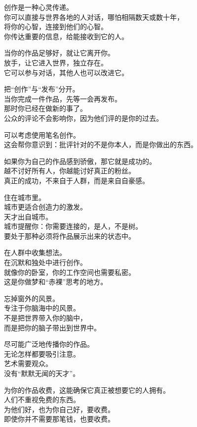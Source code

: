 \documentclass[
]{article}
\begin{document}
创作是一种心灵传递。\\
你可以直接与世界各地的人对话，哪怕相隔数天或数十年，\\
将你的心智，连接到他们的心智。\\
你传达重要的信息，给能接收到它的人。

当你的作品足够好，就让它离开你。\\
放手，让它进入世界，独立存在。\\
它可以参与对话，其他人也可以改进它。

把``创作''与``发布''分开。\\
当你完成一件作品，先等一会再发布。\\
那时你已经在做新的事了。\\
公众的评论不会影响你，因为他们评的是你的过去。

可以考虑使用笔名创作。\\
这会帮你意识到：批评针对的不是你本人，而是你做出的东西。

如果你为自己的作品感到骄傲，那它就是成功的。\\
越不讨好所有人，你越能讨好真正的粉丝。\\
真正的成功，不来自于人群，而是来自自豪感。

住在城市里。\\
城市更适合创造力的激发。\\
天才出自城市。\\
城市提醒你：你需要连接的，是人，不是树。\\
要处于那种必须将作品展示出来的状态中。

在人群中收集想法。\\
在沉默和独处中进行创作。\\
就像你的卧室，你的工作空间也需要私密。\\
这是你做梦和``赤裸''思考的地方。

忘掉窗外的风景。\\
专注于你脑海中的风景。\\
不是把世界带入你的脑中，\\
而是把你的脑子带出到世界中。

尽可能广泛地传播你的作品。\\
无论怎样都要吸引注意。\\
艺术需要观众。\\
没有``默默无闻的天才''。

为你的作品收费，这能确保它真正被想要它的人拥有。\\
人们不重视免费的东西。\\
为他们好，也为你自己好，要收费。\\
即使你并不需要那笔钱，也要收费。
\end{document}
